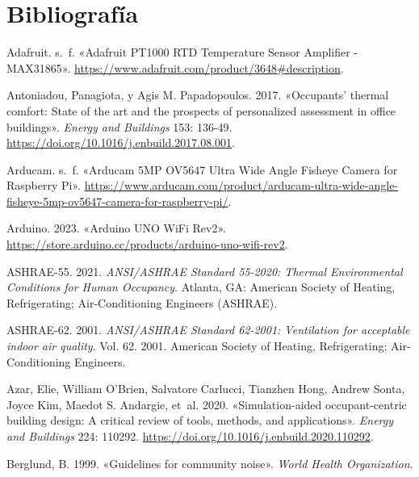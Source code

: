 \documentclass[
  letterpaper,
]{scrbook}
\newlength{\cslhangindent}
\newenvironment{CSLReferences}[2] %
 {\begin{list}{}{%
  \setlength{\itemindent}{0pt}
  \setlength{\leftmargin}{0pt}
  \setlength{\parsep}{0pt}
  \ifodd #1
   \setlength{\leftmargin}{\cslhangindent}
   \setlength{\itemindent}{-1\cslhangindent}
  \fi
  \setlength{\itemsep}{#2\baselineskip}}}
 {\end{list}}
\begin{document}

\chapter*{Bibliografía}\label{bibliografuxeda}


\label{refs}
\begin{CSLReferences}{1}{0}
Adafruit. s.~f. {«Adafruit PT1000 RTD Temperature Sensor Amplifier -
MAX31865»}. \url{https://www.adafruit.com/product/3648\#description}.

Antoniadou, Panagiota, y Agis M. Papadopoulos. 2017. {«Occupants'
thermal comfort: State of the art and the prospects of personalized
assessment in office buildings»}. \emph{Energy and Buildings} 153:
136-49. \url{https://doi.org/10.1016/j.enbuild.2017.08.001}.

Arducam. s.~f. {«Arducam 5MP OV5647 Ultra Wide Angle Fisheye Camera for
Raspberry Pi»}.
\url{https://www.arducam.com/product/arducam-ultra-wide-angle-fisheye-5mp-ov5647-camera-for-raspberry-pi/}.

Arduino. 2023. {«Arduino UNO WiFi Rev2»}.
\url{https://store.arduino.cc/products/arduino-uno-wifi-rev2}.

ASHRAE-55. 2021. \emph{ANSI/ASHRAE Standard 55-2020: Thermal
Environmental Conditions for Human Occupancy}. Atlanta, GA: American
Society of Heating, Refrigerating; Air-Conditioning Engineers (ASHRAE).

ASHRAE-62. 2001. \emph{ANSI/ASHRAE Standard 62-2001: Ventilation for
acceptable indoor air quality}. Vol. 62. 2001. American Society of
Heating, Refrigerating; Air-Conditioning Engineers.

Azar, Elie, William O'Brien, Salvatore Carlucci, Tianzhen Hong, Andrew
Sonta, Joyce Kim, Maedot S. Andargie, et~al. 2020. {«Simulation-aided
occupant-centric building design: A critical review of tools, methods,
and applications»}. \emph{Energy and Buildings} 224: 110292.
\url{https://doi.org/10.1016/j.enbuild.2020.110292}.

Berglund, B. 1999. {«Guidelines for community noise»}. \emph{World
Health Organization}.


\end{CSLReferences}
\end{document}
